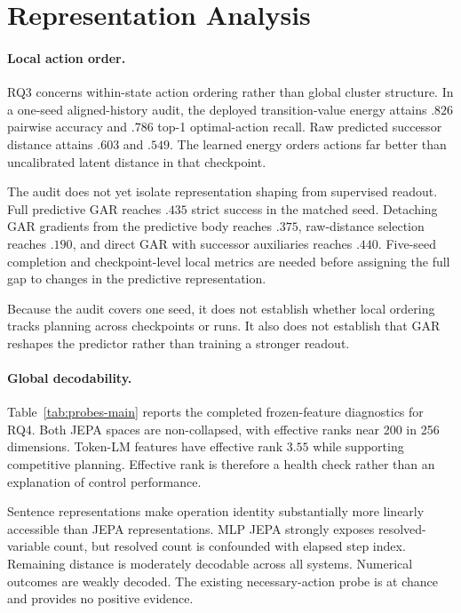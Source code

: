 \section{Representation Analysis}
\label{sec:analysis}

\paragraph{Local action order.}
RQ3 concerns within-state action ordering rather than global cluster structure. In a one-seed aligned-history audit, the deployed transition-value energy attains $.826$ pairwise accuracy and $.786$ top-1 optimal-action recall. Raw predicted successor distance attains $.603$ and $.549$. The learned energy orders actions far better than uncalibrated latent distance in that checkpoint.

The audit does not yet isolate representation shaping from supervised readout. Full predictive GAR reaches $.435$ strict success in the matched seed. Detaching GAR gradients from the predictive body reaches $.375$, raw-distance selection reaches $.190$, and direct GAR with successor auxiliaries reaches $.440$. Five-seed completion and checkpoint-level local metrics are needed before assigning the full gap to changes in the predictive representation.

Because the audit covers one seed, it does not establish whether local ordering tracks planning across checkpoints or runs. It also does not establish that GAR reshapes the predictor rather than training a stronger readout.

\paragraph{Global decodability.}
Table~\ref{tab:probes-main} reports the completed frozen-feature diagnostics for RQ4. Both JEPA spaces are non-collapsed, with effective ranks near 200 in 256 dimensions. Token-LM features have effective rank $3.55$ while supporting competitive planning. Effective rank is therefore a health check rather than an explanation of control performance.

Sentence representations make operation identity substantially more linearly accessible than JEPA representations. MLP JEPA strongly exposes resolved-variable count, but resolved count is confounded with elapsed step index. Remaining distance is moderately decodable across all systems. Numerical outcomes are weakly decoded. The existing necessary-action probe is at chance and provides no positive evidence.

